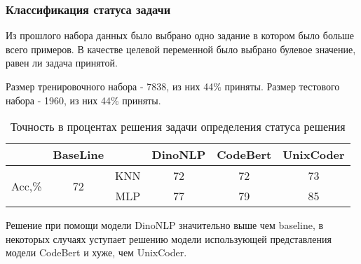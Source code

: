 \documentclass[../part_3.tex]{subfiles}
\begin{document}
\subsubsection{Классификация статуса задачи}
\par Из прошлого набора данных было выбрано одно задание в котором было больше всего примеров. В качестве целевой переменной было выбрано булевое значение, равен ли задача принятой. 
\par Размер тренировочного набора - 7838, из них 44\% приняты. Размер тестового набора - 1960, из них 44\% приняты. 
\begin{table}[H]
    \centering
    \begin{tabular}{|c|c||c|c|c|c|}\hline 
        &BaseLine&&DinoNLP&CodeBert&UnixCoder\\ \hline 
        \multirow{2}{*}{Acc,\%}&\multirow{2}{*}{72}&KNN&72&72&73\\\cline{3-6}
        &&MLP&77&79&85\\\hline
    \end{tabular}    
    \caption{Точность в процентах решения задачи определения статуса решения}
\end{table}
\par Решение при помощи модели DinoNLP значительно выше чем baseline, в некоторых случаях уступает решению модели использующей представления модели CodeBert и хуже, чем UnixCoder.
\end{document}
